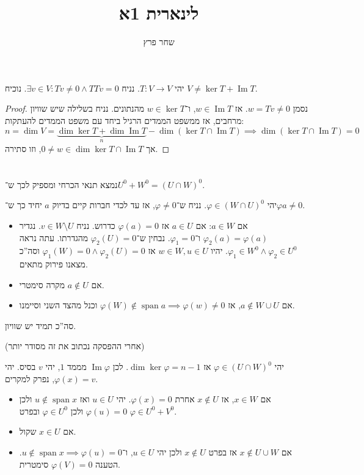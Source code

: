 \documentclass[]{article}
\author{שחר פרץ}
\title{לינארית 1א}
\DeclareMathOperator\Img   {Im}
\DeclareMathOperator{\Sp}     {span}
\newcommand\co        {\colon}
\renewcommand\phi     {\varphi}
\theoremstyle{definition}
\begin{document}
	\maketitle
	\section{}
	יהי $T \co V \to V$. נניח $\exists v\in V \co Tv \neq 0 \land TTv = 0$. נוכיח $V \neq \ker T + \Img T$. 
	
	\begin{proof}
		נסמן $w = Tv \neq 0$. אז $w \in \Img T$, ו־$w \in \ker T$ מהנתונים. נניח בשלילה שיש שוויון מרחבים, אז ממשפט הממדים הרגיל ביחד עם משפט הממדים להעתקות: 
		\[ n = \dim V = \underbrace{\dim \ker T + \dim \Img T}_{n} - \dim (\ker T \cap \Img T) \implies \dim (\ker T \cap \Img T) = 0 \]
		אך $0 \neq w \in \dim \ker T \cap \Img T$, וזו סתירה. 
	\end{proof}
	
	\section{}
	נמצא תנאי הכרחי ומספיק לכך ש־$U^0 + W^0 = (U \cap W)^0$. 
	
	יהי $\phi \in (W \cap U)^0$. נניח ש־$\phi \neq 0$, אז עד לכדי חברות קיים בדיוק $a$ יחיד כך ש־$\phi a \neq 0$. 
	
	\begin{itemize}
		\item אם $a \in W$: אם $a \in U$ אז $\phi(a) = 0$ כדרוש. נניח $v \in W \setminus U$. נגדיר $\phi_2(a) = \phi(a)$ ו־$\phi_1 = 0$. נבחין ש־$\phi_2(U) = 0$ מהגדרתו. עתה נראה $\phi_1 \in W^0 \land \phi_2 \in U^0$. יהיו $w \in W, u \in U$ אז $\phi_1(W) = 0 \land \phi_2(U) = 0$ וסה''כ מצאנו פירוק מתאים. 
		\item אם $a \notin U$ מקרה סימטרי. 
		\item אם $a \notin W \cup U$, אז $\phi(W) \notin \Sp a \implies \phi(w) \neq 0$ וכנל מהצד השני וסיימנו. 
	\end{itemize}
	סה''כ תמיד יש שוויון. 
	
	(אחרי ההפסקה נכתוב את זה מסודר יותר)
	
	יהי $\phi \in (U \cap W)^0$ אז $\dim \ker \phi = n - 1$. לכן $\Img \phi$ מממד $1$, יהי $v$ בסיס. יהי $\phi(x) = v$, נפרק למקרים. 
	\begin{itemize}
		\item אם $x \in W$, אז $x \notin U$ אחרת $\phi(x) = 0$. יהי $u \in U$ ואז $u \notin \Sp x$ ולכן $\phi(u) = 0$ ולכן $\phi \in U^0$ ובפרט $\phi \in U^0 + V^0$. 
		\item אם $x \in U$ שקול. 
		\item אם $x \notin U \cup W$ אז בפרט $x \notin U$ ולכן יהי $u \in U$, ו־$u \notin \Sp x \implies \phi(u) = 0$. הטענה $\phi(V) = 0$ סימטרית. 
	\end{itemize}
	
\end{document}
